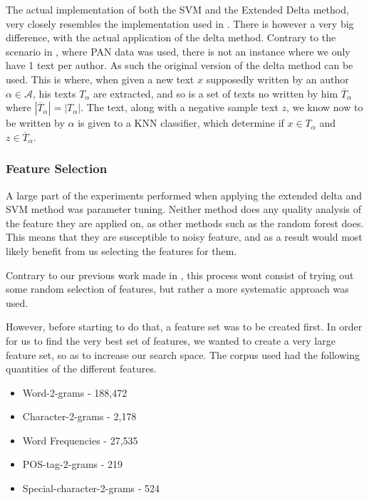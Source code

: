 The actual implementation of both the \gls{SVM} and the Extended Delta method,
very closely resembles the implementation used in \cite{US}. There is however a
very big difference, with the actual application of the delta method. Contrary
to the scenario in \cite{US}, where PAN data was used, there is not an instance
where we only have 1 text per author. As such the original version of the
delta method can be used.\cite{evert2015towards} This is where, when given a
new text $x$ supposedly written by an author $\alpha \in \mathcal{A}$, his
texts $T_\alpha$ are extracted, and so is a set of texts no written by him
$\overline{T}_\alpha$ where $|\overline{T}_\alpha| = |T_\alpha|$. The text,
along with a negative sample text $z$, we know now to be written by $\alpha$ is
given to a \gls{KNN} classifier, which determine if $x \in T_\alpha$ and $z \in
\overline{T}_\alpha$.

\subsubsection{Feature Selection}

A large part of the experiments performed when applying the extended delta and
\gls{SVM} method was parameter tuning. Neither method does any quality analysis
of the feature they are applied on, as other methods such as the random forest
does. This means that they are susceptible to noisy feature, and as a result
would most likely benefit from us selecting the features for them.

Contrary to our previous work made in \cite{US}, this process wont
consist of trying out some random selection of features, but rather
a more systematic approach was used.

However, before starting to do that, a feature set was to be created
first. In order for us to find the very best set of features, we wanted
to create a very large feature set, so as to increase our search space.
The corpus used had the following quantities of the different features.

\begin{itemize}
    \item Word-2-grams - 188,472
    \item Character-2-grams - 2,178
    \item Word Frequencies - 27,535
    \item \gls{POS}-tag-2-grams - 219
    \item Special-character-2-grams - 524
\end{itemize}

